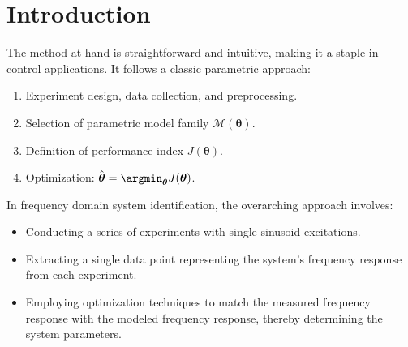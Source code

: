 \section{Introduction}

The method at hand is straightforward and intuitive, making it a staple in control applications. 
It follows a classic parametric approach:
\begin{enumerate}
    \item Experiment design, data collection, and preprocessing.
    \item Selection of parametric model family $\mathcal{M}(\boldsymbol{\theta})$. 
    \item Definition of performance index $J(\boldsymbol{\theta})$. 
    \item Optimization: $\hat{\boldsymbol{\theta}}=\argmin_{\boldsymbol{\theta}}{J(\boldsymbol{\theta})}$.  
\end{enumerate}
In frequency domain system identification, the overarching approach involves:
\begin{itemize}
    \item Conducting a series of experiments with single-sinusoid excitations.
    \item Extracting a single data point representing the system's frequency response from each experiment.
    \item Employing optimization techniques to match the measured frequency response with the modeled frequency response, thereby determining the system parameters.
\end{itemize}